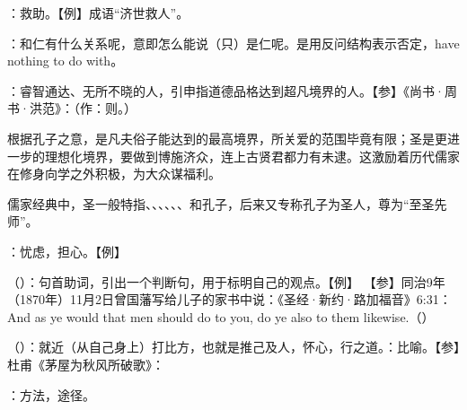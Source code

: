 {
\item {}：救助。【例】成语“济世救人”。
\item {}：和仁有什么关系呢，意即怎么能说（只）是仁呢。是用反问结构表示否定，have nothing to do with。
\item {}：睿智通达、无所不晓的人，引申指道德品格达到超凡境界的人。【参】《尚书·周书·洪范》：（作：则。）

根据孔子之意，是凡夫俗子能达到的最高境界，所关爱的范围毕竟有限；圣是更进一步的理想化境界，要做到博施济众，连上古贤君都力有未逮。这激励着历代儒家在修身向学之外积极，为大众谋福利。%

儒家经典中，圣一般特指、、、、、、和孔子，后来又专称孔子为圣人，尊为“至圣先师”。

\item {}：忧虑，担心。【例】 

\item {}（）：句首助词，引出一个判断句，用于标明自己的观点。【例】 【参】同治9年（1870年）11月2日曾国藩写给儿子的家书中说：《圣经·新约·路加福音》6:31：And as ye would that men should do to you, do ye also to them likewise.（）
\item {}（）：就近（从自己身上）打比方，也就是推己及人，怀心，行之道。：比喻。【参】杜甫《茅屋为秋风所破歌》：
\item {}：方法，途径。
}
{}



